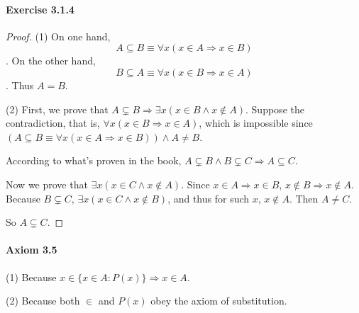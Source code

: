 \paragraph{Exercise 3.1.4} \label{exercise3.1.4}
\begin{proof}
(1) 
On one hand,
\[
A \subseteq B \equiv \forall x(x \in A \Longrightarrow x \in B)
\]. 
On the other hand,
\[
B \subseteq A \equiv \forall x(x \in B \Longrightarrow x \in A)
\].
Thus $A=B$.

(2)
First, we prove that $A \subsetneq B \Longrightarrow \exists x(x \in B \wedge x \notin A)$. Suppose the 
contradiction, that is, $\forall x(x\in B \Longrightarrow x \in A)$, which is impossible since 
$(A \subseteq B \equiv \forall x(x\in A \Longrightarrow x \in B))\wedge A \neq B$.

According to what's proven in the book, 
$A \subsetneq B \wedge B \subsetneq C \Longrightarrow A \subseteq C$.

Now we prove that $\exists x(x \in C \wedge x \notin A)$. Since $x \in A \Longrightarrow x \in B$, 
$x \notin B \Longrightarrow x \notin A$. Because $B \subsetneq C$, 
$\exists x(x \in C \wedge x \notin B)$, and thus for such $x$, $ x \notin A$. Then $A \neq C$.

So $A \subsetneq C$. 
\end{proof}

\paragraph{Axiom 3.5}
(1) Because $x \in \{x \in A : P(x)\} \Rightarrow x \in A$.

(2) Because both $\in$ and $P(x)$ obey the axiom of substitution.


